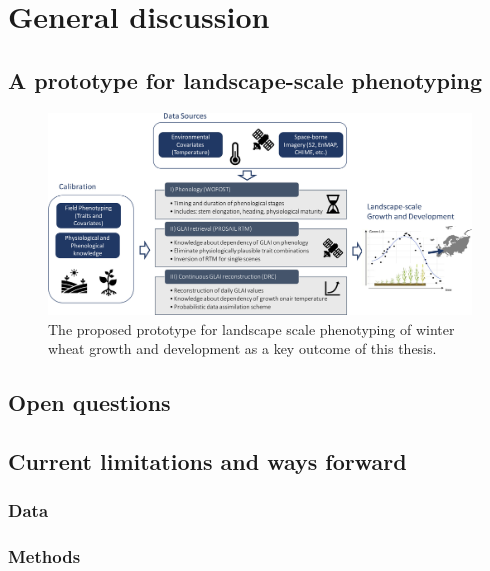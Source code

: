 \chapter{General discussion}
\label{chap:general-discussion}

\section{A prototype for landscape-scale phenotyping}

\begin{figure}[H]
    \centering
    \includegraphics[width=\textwidth]{07-Discussion/img/prototype.jpg}
    \caption{The proposed prototype for landscape scale phenotyping of winter wheat growth and development as a key outcome of this thesis.}
    \label{fig:oa-disc-prototype}
\end{figure}

\section{Open questions}

\section{Current limitations and ways forward}
\subsection{Data}
\subsection{Methods}
